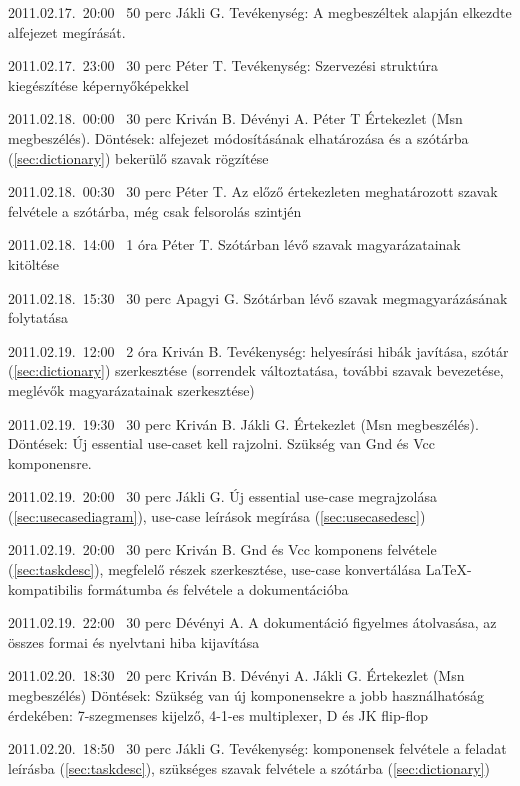 \begin{naplo}
\bejegyzes
{2011.02.17.~20:00~}
{50 perc}
{Jákli G.}
{Tevékenység: A megbeszéltek alapján el\-kezdte  alfejezet megírását.}

\bejegyzes
{2011.02.17.~23:00~}
{30 perc}
{Péter T.}
{Tevékenység: Szervezési struktúra kiegészí\-tése képernyőképekkel}

\bejegyzes
{2011.02.18.~00:00~}
{30 perc}
{Kriván B.\newline
Dévényi A.\newline
Péter T}
{Értekezlet (Msn megbeszélés).\newline
Döntések:  alfejezet módosításának elhatározása és a szótárba (\ref{sec:dictionary}) bekerülő szavak rögzítése}

\bejegyzes
{2011.02.18.~00:30~}
{30 perc}
{Péter T.}
{Az előző értekezleten meghatározott szavak felvétele a szótárba, még csak felsorolás szint\-jén}

\bejegyzes
{2011.02.18.~14:00~}
{1 óra}
{Péter T.}
{Szótárban lévő szavak magyarázatainak kitöl\-tése}

\bejegyzes
{2011.02.18.~15:30~}
{30 perc}
{Apagyi G.}
{Szótárban lévő szavak megmagyarázásának folytatása}

\bejegyzes
{2011.02.19.~12:00~}
{2 óra}
{Kriván B.}
{Tevékenység: helyesírási hibák javítása, szó\-tár (\ref{sec:dictionary}) szerkesztése (sorrendek változtatása, további szavak bevezetése, meglévők magya\-rázatainak szerkesztése)}

\bejegyzes
{2011.02.19.~19:30~}
{30 perc}
{Kriván B.\newline
Jákli G.}
{Értekezlet (Msn megbeszélés).\newline
Döntések: Új essential use-caset kell rajzolni. Szükség van Gnd és Vcc komponensre.}

\bejegyzes
{2011.02.19.~20:00~}
{30 perc}
{Jákli G.}
{Új essential use-case megrajzolása (\ref{sec:usecasediagram}), use-case leírások megírása (\ref{sec:usecasedesc})}

\bejegyzes
{2011.02.19.~20:00~}
{30 perc}
{Kriván B.}
{Gnd és Vcc komponens felvétele (\ref{sec:taskdesc}), megfelelő részek szerkesztése, use-case konvertálása \LaTeX{}-kompatibilis formátumba és felvétele a dokumentációba}

\bejegyzes
{2011.02.19.~22:00~}
{30 perc}
{Dévényi A.}
{A dokumentáció figyelmes átolvasása, az összes formai és nyelvtani hiba kijavítása}

\bejegyzes
{2011.02.20.~18:30~}
{20 perc}
{Kriván B.\newline
Dévényi A.\newline
Jákli G.}
{Értekezlet (Msn megbeszélés)\newline
Döntések: Szükség van új komponensekre a jobb használhatóság érdekében: 7-szegmenses kijelző, 4-1-es multiplexer, D és JK flip-flop}

\bejegyzes
{2011.02.20.~18:50~}
{30 perc}
{Jákli G.}
{Tevékenység: komponensek felvétele a feladat leírásba (\ref{sec:taskdesc}), szükséges szavak felvétele a szótárba (\ref{sec:dictionary})}

\end{naplo}


